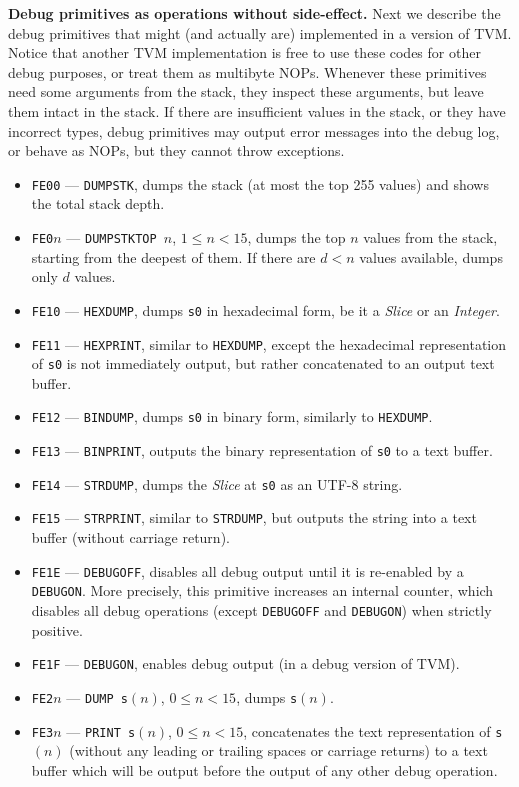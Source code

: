 \documentclass[12pt,oneside]{article}
\def\makepoint#1{\medbreak\noindent{\bf #1.\ }}
\def\nxsubpoint{\refstepcounter{subsubsection}%
  \smallbreak\makepoint{\thesubsubsection}}
\def\emb#1{\textbf{#1.}}
\begin{document}
\nxsubpoint\emb{Debug primitives as operations without side-effect}
Next we describe the debug primitives that might (and actually are) implemented in a version of TVM. Notice that another TVM implementation is free to use these codes for other debug purposes, or treat them as multibyte NOPs. Whenever these primitives need some arguments from the stack, they inspect these arguments, but leave them intact in the stack. If there are insufficient values in the stack, or they have incorrect types, debug primitives may output error messages into the debug log, or behave as NOPs, but they cannot throw exceptions.
\begin{itemize}
\item {\tt FE00} --- {\tt DUMPSTK}, dumps the stack (at most the top 255 values) and shows the total stack depth.
\item {\tt FE0$n$} --- {\tt DUMPSTKTOP $n$}, $1\leq n<15$, dumps the top $n$ values from the stack, starting from the deepest of them. If there are $d<n$ values available, dumps only $d$ values.
\item {\tt FE10} --- {\tt HEXDUMP}, dumps {\tt s0} in hexadecimal form, be it a {\em Slice} or an {\em Integer}.
\item {\tt FE11} --- {\tt HEXPRINT}, similar to {\tt HEXDUMP}, except the hexadecimal representation of {\tt s0} is not immediately output, but rather concatenated to an output text buffer.
\item {\tt FE12} --- {\tt BINDUMP}, dumps {\tt s0} in binary form, similarly to {\tt HEXDUMP}.
\item {\tt FE13} --- {\tt BINPRINT}, outputs the binary representation of {\tt s0} to a text buffer.
\item {\tt FE14} --- {\tt STRDUMP}, dumps the {\em Slice} at {\tt s0} as an UTF-8 string.
\item {\tt FE15} --- {\tt STRPRINT}, similar to {\tt STRDUMP}, but outputs the string into a text buffer (without carriage return).
\item {\tt FE1E} --- {\tt DEBUGOFF}, disables all debug output until it is re-enabled by a {\tt DEBUGON}. More precisely, this primitive increases an internal counter, which disables all debug operations (except {\tt DEBUGOFF} and {\tt DEBUGON}) when strictly positive.
\item {\tt FE1F} --- {\tt DEBUGON}, enables debug output (in a debug version of TVM).
\item {\tt FE2$n$} --- {\tt DUMP s$(n)$}, $0\leq n<15$, dumps {\tt s}$(n)$.
\item {\tt FE3$n$} --- {\tt PRINT s$(n)$}, $0\leq n<15$, concatenates the text representation of {\tt s}$(n)$ (without any leading or trailing spaces or carriage returns) to a text buffer which will be output before the output of any other debug operation.

\end{itemize}
\end{document}
